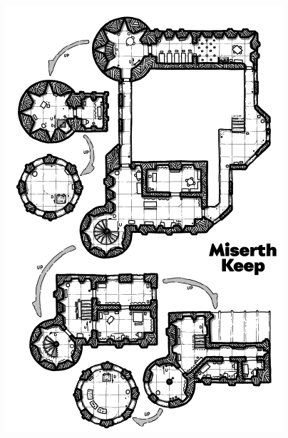 \documentclass[
]{book}
\begin{document}
\begin{center}\includegraphics[width=1\linewidth]{graphics/miserth-keep-upstairs} \end{center}
\end{document}
